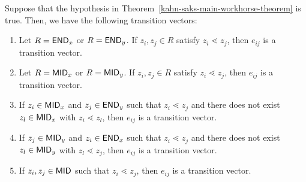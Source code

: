 \documentclass{puthesis-UG}
\begin{document}
\begin{lem} \label{some-transition-vectors}
    Suppose that the hypothesis in Theorem~\ref{kahn-saks-main-workhorse-theorem} is true. Then, we have the following transition vectors: 
    \begin{enumerate}[label = (\alph*)]
        \item Let $R = \mathsf{END}_x$ or $R = \mathsf{END}_y$. If $z_i, z_j \in R$ satisfy $z_i \lessdot z_j$, then $e_{ij}$ is a transition vector.

        \item Let $R = \mathsf{MID}_x$ or $R = \mathsf{MID}_y$. If $z_i, z_j \in R$ satisfy $z_i \lessdot z_j$, then $e_{ij}$ is a transition vector. 

        \item If $z_i \in \mathsf{MID}_x$ and $z_j \in \mathsf{END}_y$ such that $z_i \lessdot z_j$ and there does not exist $z_l \in \mathsf{MID}_x$ with $z_i \lessdot z_l$, then $e_{ij}$ is a transition vector. 

        \item If $z_j \in \mathsf{MID}_y$ and $z_i \in \mathsf{END}_x$ such that $z_i \lessdot z_j$ and there does not exist $z_l \in \mathsf{MID}_y$ with $z_l \lessdot z_j$, then $e_{ij}$ is a transition vector. 

        \item If $z_i, z_j \in \mathsf{MID}$ such that $z_i \lessdot z_j$, then $e_{ij}$ is a transition vector. 
    \end{enumerate}
\end{lem}
\end{document}
